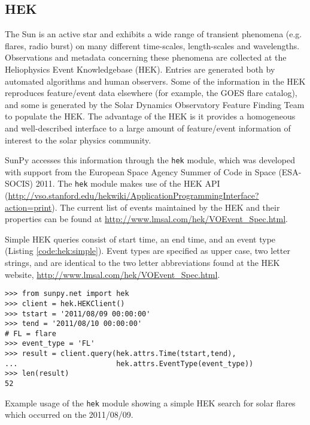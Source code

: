 \subsection{HEK}\label{ssec:hek}

The Sun is an active star and exhibits a wide range of transient phenomena (e.g. flares, 
radio burst) on many 
different time-scales, length-scales and wavelengths. Observations and metadata 
concerning these phenomena are collected at the Heliophysics Event 
Knowledgebase (HEK).  Entries are generated both by automated algorithms and 
human observers.  Some of the information in the HEK reproduces feature/event 
data elsewhere (for example, the GOES flare catalog), and some is generated by 
the Solar Dynamics Observatory Feature Finding Team \cite{SDOFFT paper???} to
populate the HEK.  The advantage of the HEK is it provides a homogeneous and 
well-described interface to a large 
amount of feature/event information of interest to the solar physics community.

SunPy accesses this information through the \texttt{hek} module, which was 
developed with support from the European Space Agency Summer of Code in 
Space (ESA-SOCIS) 2011.  The \texttt{hek} module makes use of the HEK API
(\url{http://vso.stanford.edu/hekwiki/ApplicationProgrammingInterface?action=print}).
The current list of 
events maintained by the HEK and their properties can be found at 
\url{http://www.lmsal.com/hek/VOEvent_Spec.html}.

Simple HEK queries consist of start time, an end time, and an event type 
(Listing \ref{code:hek:simple}). Event types are specified as upper case, 
two letter strings, and are 
identical to the two letter abbreviations found at the HEK website, 
\url{http://www.lmsal.com/hek/VOEvent_Spec.html}.

\begin{listing}[H]
\begin{verbatim}
>>> from sunpy.net import hek
>>> client = hek.HEKClient()
>>> tstart = '2011/08/09 00:00:00'
>>> tend = '2011/08/10 00:00:00'
# FL = flare
>>> event_type = 'FL'
>>> result = client.query(hek.attrs.Time(tstart,tend), 
...                       hek.attrs.EventType(event_type))
>>> len(result)
52
\end{verbatim}
\caption{Example usage of the \texttt{hek} module showing a simple HEK search for solar flares
which occurred on the 2011/08/09.}
\label{code:hek:simple}
\end{listing}

